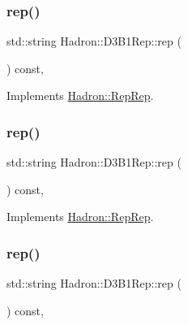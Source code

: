 \subsubsection{\texorpdfstring{rep()}{rep()}\hspace{0.1cm}{\footnotesize\ttfamily [3/5]}}
{\footnotesize\ttfamily std\+::string Hadron\+::\+D3\+B1\+Rep\+::rep (\begin{DoxyParamCaption}{ }\end{DoxyParamCaption}) const\hspace{0.3cm}{\ttfamily [inline]}, {\ttfamily [virtual]}}



Implements \mbox{\hyperlink{structHadron_1_1RepRep_ab3213025f6de249f7095892109575fde}{Hadron\+::\+Rep\+Rep}}.

\mbox{\label{structHadron_1_1D3B1Rep_a12a506574bb30503f11952150a0a7d6f}} 
\subsubsection{\texorpdfstring{rep()}{rep()}\hspace{0.1cm}{\footnotesize\ttfamily [4/5]}}
{\footnotesize\ttfamily std\+::string Hadron\+::\+D3\+B1\+Rep\+::rep (\begin{DoxyParamCaption}{ }\end{DoxyParamCaption}) const\hspace{0.3cm}{\ttfamily [inline]}, {\ttfamily [virtual]}}



Implements \mbox{\hyperlink{structHadron_1_1RepRep_ab3213025f6de249f7095892109575fde}{Hadron\+::\+Rep\+Rep}}.

\mbox{\label{structHadron_1_1D3B1Rep_a12a506574bb30503f11952150a0a7d6f}} 
\subsubsection{\texorpdfstring{rep()}{rep()}\hspace{0.1cm}{\footnotesize\ttfamily [5/5]}}
{\footnotesize\ttfamily std\+::string Hadron\+::\+D3\+B1\+Rep\+::rep (\begin{DoxyParamCaption}{ }\end{DoxyParamCaption}) const\hspace{0.3cm}{\ttfamily [inline]}, {\ttfamily [virtual]}}



